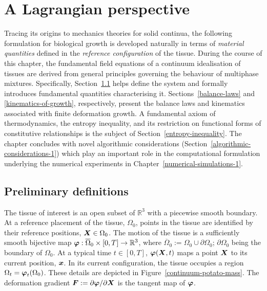 \chapter{A Lagrangian perspective}
\label{lagrangian-perspective}


Tracing its origins to mechanics theories for solid continua, the
following formulation for biological growth is developed naturally in
terms of {\em material quantities} defined in the {\em reference
  configuration} of the tissue. During the course of this chapter, the
fundamental field equations of a continuum idealisation of tissues are
derived from general principles governing the behaviour of multiphase
mixtures. Specifically, Section~\ref{preliminary-definitions} helps
define the system and formally introduces fundamental quantities
characterising it. Sections~\ref{balance-laws} and
\ref{kinematics-of-growth}, respectively, present the balance laws and
kinematics associated with finite deformation growth. A fundamental
axiom of thermodynamics, the entropy inequality, and its restriction
on functional forms of constitutive relationships is the subject of
Section~\ref{entropy-inequality}. The chapter concludes with novel
algorithmic considerations
(Section~\ref{algorithmic-considerations-1}) which play an important
role in the computational formulation underlying the numerical
experiments in
Chapter~\ref{numerical-simulations-1}.

\section{Preliminary definitions}
\label{preliminary-definitions}

The tissue of interest is an open subset of $\mathbb{R}^3$ with a
piecewise smooth boundary. At a reference placement of the tissue,
$\Omega_0$, points in the tissue are identified by their reference
positions, $\mbox{\boldmath$ X$} \in \Omega_0$. The motion of the tissue is a
sufficiently smooth bijective map $\mbox{\boldmath$\varphi$}: \overline{\Omega}_0
\times [0,T] \rightarrow \mathbb{R}^3$, where $\overline{\Omega}_0 :=
\Omega_0 \cup \partial\Omega_0$; $\partial\Omega_0$ being the boundary
of $\Omega_0$. At a typical time $t \in [0,T]$, $\mbox{\boldmath$\varphi$}(\mbox{\boldmath$ X$},t)$ maps
a point $\mbox{\boldmath$ X$}$ to its current position, $\mbox{\boldmath$ x$}$. In its current
configuration, the tissue occupies a region $\Omega_t = \mbox{\boldmath$\varphi$}_t
(\Omega_0)$. These details are depicted in
Figure~\ref{continuum-potato-mass}. The deformation gradient $\mbox{\boldmath$ F$} :=
\partial \mbox{\boldmath$\varphi$}/ \partial\mbox{\boldmath$ X$}$ is the tangent map of $\mbox{\boldmath$\varphi$}$.

